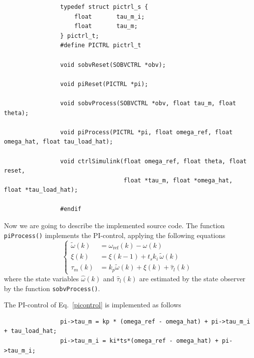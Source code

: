 \documentclass[12pt,a4paper,oneside]{book}
\begin{document}
\begin{onehalfspace}
\begin{mybox}
{\begin{verbatim}
				typedef struct pictrl_s {
				    float		tau_m_i;			
				    float		tau_m;			
				} pictrl_t;
				#define PICTRL pictrl_t
				
				void sobvReset(SOBVCTRL *obv);
				
				void piReset(PICTRL *pi);
				
				void sobvProcess(SOBVCTRL *obv, float tau_m, float theta);
				
				void piProcess(PICTRL *pi, float omega_ref, float omega_hat, float tau_load_hat);
				
				void ctrlSimulink(float omega_ref, float theta, float reset, 
				                  float *tau_m, float *omega_hat, float *tau_load_hat);
				
				#endif
		\end{verbatim}}
	\end{mybox}
	
	
	Now we are going to describe the implemented source code. The function \texttt{piProcess()} implements the PI-control, applying the following equations
	\begin{equation} \label{picontrol}
		\left\lbrace \begin{aligned}
			\tilde{\omega}(k)&=\omega_\text{ref}(k)-\omega(k)\\[6pt]
			\xi(k) &= \xi(k-1) + t_sk_i\,\tilde{\omega}(k) \\[6pt]
			\tau_m(k) &= k_p\tilde{\omega}(k)+ \xi(k) + \hat{\tau}_l(k) 
		\end{aligned}\right. 
	\end{equation} 
	where the state variables $\hat{\omega}(k)$ and $\hat{\tau}_l(k)$ are estimated by the state observer by the function \texttt{sobvProcess()}.
	
	The PI-control of Eq.~\eqref{picontrol}   is implemented as follows
	\begin{mybox}
		{\selectfont \footnotesize \noindent
			\begin{verbatim}
				pi->tau_m = kp * (omega_ref - omega_hat) + pi->tau_m_i + tau_load_hat; 
				pi->tau_m_i = ki*ts*(omega_ref - omega_hat) + pi->tau_m_i;
		\end{verbatim}}
	\end{mybox}
	

\end{onehalfspace}
\end{document}
